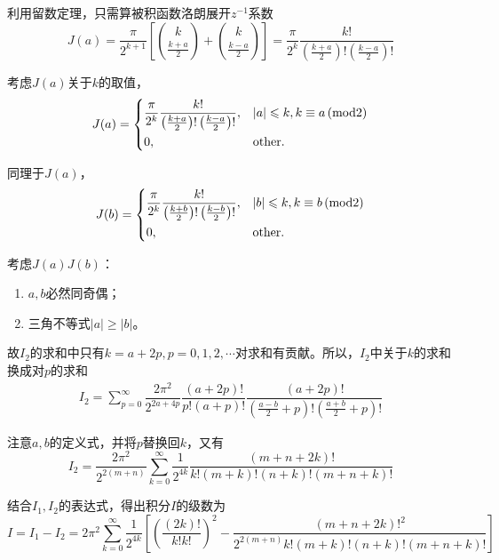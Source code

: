 \documentclass{article} %
\begin{document}
利用留数定理，只需算被积函数洛朗展开$z^{-1}$系数
\begin{equation}
  J(a)=\dfrac{\pi}{2^{k+1}}\left[\binom{k}{\frac{k+a}{2}}+\binom{k}{\frac{k-a}{2}}\right]=\dfrac{\pi}{2^k}\dfrac{k!}{\left(\frac{k+a}{2}\right)!\left(\frac{k-a}{2}\right)!}
\end{equation}

考虑$J(a)$关于$k$的取值，
\begin{equation}
  J(a)=
  \begin{dcases}
    \dfrac{\pi}{2^k}\dfrac{k!}{\left(\frac{k+a}{2}\right)!\left(\frac{k-a}{2}\right)!},&|a|\leqslant k,k\equiv a\,(\text{mod}2)\\
    0,&\text{other}.
  \end{dcases}
\end{equation}

同理于$J(a)$，
\begin{equation}
  J(b)=
  \begin{dcases}
    \dfrac{\pi}{2^k}\dfrac{k!}{\left(\frac{k+b}{2}\right)!\left(\frac{k-b}{2}\right)!},&|b|\leqslant k,k\equiv b\,(\text{mod}2)\\
    0,&\text{other}.
  \end{dcases}
\end{equation}

考虑$J(a)J(b)$：
\begin{enumerate}
  \item $a,b$必然同奇偶；
  \item 三角不等式$|a|\geqslant|b|$。
\end{enumerate}
故$I_2$的求和中只有$k=a+2p,p=0,1,2,\cdots$对求和有贡献。所以，$I_2$中关于$k$的求和换成对$p$的求和
\begin{align}
  I_2=\sum_{p=0}^{\infty}\dfrac{2\pi^2}{2^{2a+4p}}\dfrac{(a+2p)!}{p!(a+p)!}\dfrac{(a+2p)!}{(\frac{a-b}{2}+p)!(\frac{a+b}{2}+p)!}
\end{align}

注意$a,b$的定义式，并将$p$替换回$k$，又有
\begin{equation}
  I_2=\dfrac{2\pi^2}{2^{2(m+n)}}\sum_{k=0}^{\infty}\dfrac{1}{2^{4k}}\dfrac{(m+n+2k)!}{k!(m+k)!(n+k)!(m+n+k)!}
\end{equation}

结合$I_1,I_2$的表达式，得出积分$I$的级数为
\begin{equation}
  I=I_1-I_2=2\pi^2\sum_{k=0}^{\infty}\dfrac{1}{2^{4k}}\left[\left(\dfrac{(2k)!}{k!k!}\right)^2-\dfrac{(m+n+2k)!^2}{2^{2(m+n)}k!(m+k)!(n+k)!(m+n+k)!}\right]
\end{equation}
\end{document}
